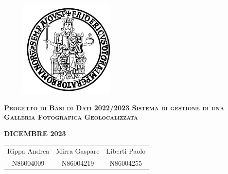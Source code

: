 \documentclass{report}
\begin{document}
    \begin{figure}[htbp!]
        \begin{center}
            \includegraphics[width=.25\textwidth]{Immagini/FedericoII.png}
        \end{center}
    \end{figure}

    
    {\scshape\Large\bfseries Progetto di Basi di Dati 2022/2023 \break Sistema di gestione di una Galleria Fotografica Geolocalizzata}

    \begin{center}

    
    \textbf{DICEMBRE 2023}
    
    \vspace{2em}
    
    \begin{tabular}{ccc}
    Rippa Andrea & 
    Mirra Gaspare  & 
    Liberti Paolo \\
    N86004009 &
    N86004219 &
    N86004255 \\
    \end{tabular}
    \end{center}
    
    \newpage
    
    \tableofcontents
    
    
    
    
    
\end{document}
